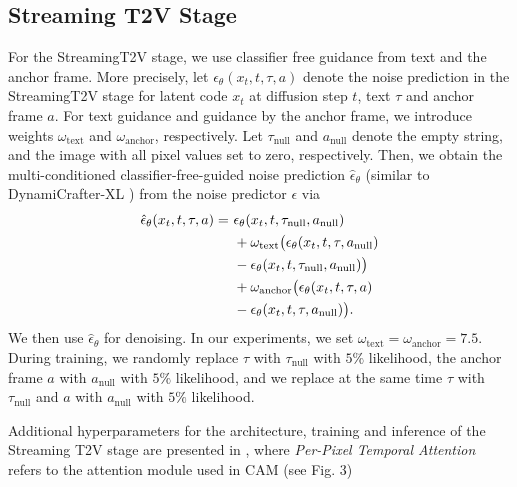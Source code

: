 \subsection{Streaming T2V Stage}
For the StreamingT2V stage, we use classifier free guidance  \cite{ho2022classifier,gen1_paper} from text and the anchor frame. More precisely, let $\epsilon_{\theta}(x_t,t,\tau,a)$ denote the noise prediction in the StreamingT2V stage for latent code $x_t$ at diffusion step $t$, text $\tau$ and anchor frame $a$.
For text guidance and guidance by the anchor frame, we introduce weights $\omega_{\mathrm{text}}$ and $\omega_{\mathrm{anchor}} $, respectively. Let $\tau_{\mathrm{null}}$ and $a_{\mathrm{null}}$ denote the empty string, and the image with all pixel values set to zero, respectively. Then, we obtain the multi-conditioned classifier-free-guided noise prediction $\hat{\epsilon}_{\theta}$  (similar to DynamiCrafter-XL   \cite{xing2023dynamicrafter}) from 
the noise predictor $\epsilon$ via  
\begin{align}    
    \notag \hat{\epsilon}_{\theta}(x_t,t,\tau,a) =\ &\epsilon_{\theta}(x_t,t,\tau_{\mathrm{null}},a_{\mathrm{null}}) \\ & \notag
    + \omega_{\mathrm{text}}  \bigl(\epsilon_{\theta}(x_t,t,\tau,a_{\mathrm{null}}) \\ & \notag
    - \epsilon_{\theta}(x_t,t,\tau_{\mathrm{null}},a_{\mathrm{null}})\bigr) \\ &   \notag
     + \omega_{\mathrm{anchor}} \bigl(\epsilon_{\theta}(x_t,t,\tau,a)  \\ &
     - \epsilon_{\theta}(x_t,t,\tau,a_{\mathrm{null}})\bigr). 
\end{align}
We then use $\hat{\epsilon}_{\theta}$ for denoising. 
In our experiments, we set $\omega_{\mathrm{text}} = \omega_{\mathrm{anchor}} = 7.5$.
During training, we randomly replace $\tau$ with $\tau_{\mathrm{null}}$ with $5 \% $ likelihood, the anchor frame $a$ with $a_{\mathrm{null}}$ with $5 \%$ likelihood, and we replace at the same time $\tau$ with $\tau_{\mathrm{null}}$  and  $a$ with $a_{\mathrm{null}}$ with $5\%$ likelihood. 

Additional hyperparameters for the architecture, training and inference of the  Streaming T2V stage are presented in , where \textit{Per-Pixel Temporal Attention} refers to the attention module used in CAM 
(see Fig. \textcolor{linkblue}{3})

